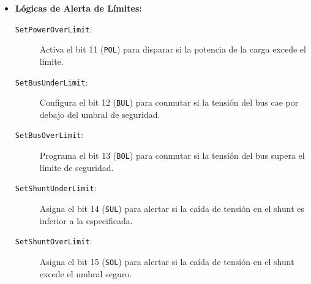 \documentclass[
10pt, %
a4paper, %
oneside, %
headinclude,footinclude, %
BCOR5mm, %
]{scrartcl}
\begin{document}
\begin{itemize}
	\item \textbf{Lógicas de Alerta de Límites:}
		\begin{description}
			\item[\texttt{SetPowerOverLimit}:] Activa el bit 11 (\texttt{POL}) para disparar si la potencia de la carga excede el límite.
			\item[\texttt{SetBusUnderLimit}:] Configura el bit 12 (\texttt{BUL}) para conmutar si la tensión del bus cae por debajo del umbral de seguridad.
			\item[\texttt{SetBusOverLimit}:] Programa el bit 13 (\texttt{BOL}) para conmutar si la tensión del bus supera el límite de seguridad.
			\item[\texttt{SetShuntUnderLimit}:] Asigna el bit 14 (\texttt{SUL}) para alertar si la caída de tensión en el shunt es inferior a la especificada.
			\item[\texttt{SetShuntOverLimit}:] Asigna el bit 15 (\texttt{SOL}) para alertar si la caída de tensión en el shunt excede el umbral seguro.
		\end{description}
\end{itemize}
\end{document}
